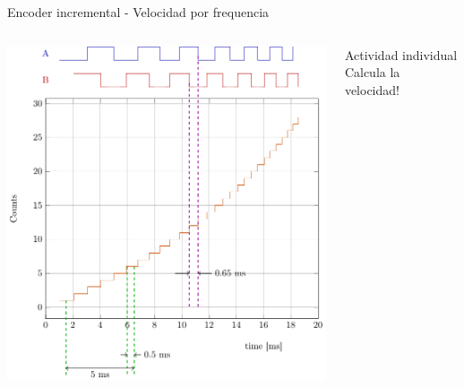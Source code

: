 \documentclass[presentation,aspectratio=169]{beamer}
\begin{document}
\begin{frame}[label={sec:org36b2be8}]{Encoder incremental - Velocidad por frequencia}
\begin{columns}
\begin{column}{0.5\columnwidth}
\begin{center}
\includegraphics[width=\textwidth]{../../figures/encoder-signals-nonuniform}
\end{center}
\end{column}
\begin{column}{0.5\columnwidth}
\alert{Actividad individual} Calcula la velocidad!
\end{column}
\end{columns}
\end{frame}
\end{document}
